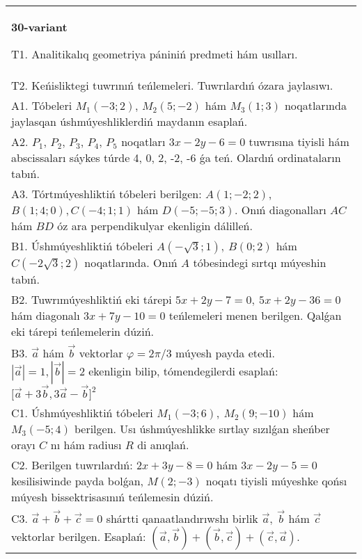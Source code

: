 \documentclass{article}
\begin{document}
\begin{tabular}{m{17cm}}
\textbf{30-variant}
\newline

T1. Analitikalıq geometriya pániniń predmeti hám usılları. 
 \\
T2. 
Keńisliktegi tuwrınıń teńlemeleri. Tuwrılardıń ózara jaylasıwı.
 \\
A1. 
Tóbeleri $M_1(-3;2)$, $M_2(5;-2)$ hám $M_3(1;3)$ 
noqatlarında jaylasqan úshmúyeshliklerdiń maydanın esaplań.
 \\
A2. 
$P_1$, $P_2$, $P_3$, $P_4$, $P_5$  noqatları 
$3x-2y-6=0$ tuwrısına tiyisli hám abscissaları sáykes túrde 
4, 0, 2, -2, -6 ǵa teń. Olardıń ordinataların tabıń.
 \\
A3. 
Tórtmúyeshliktiń tóbeleri berilgen:
$A (1; - 2;2) $, $B (1;4;0),C (- 4;1;1) $ hám $D (- 5; -5;3) $. Onıń diagonalları $AC$ hám $BD$ óz ara 
perpendikulyar ekenligin dálilleń.
 \\
B1. 
Úshmúyeshliktiń tóbeleri
\(A\left(-\sqrt{3};1 \right),\ B(0;2)\) hám
\(C\left(-2\sqrt{3};2 \right)\) noqatlarında. Onıń $A$
tóbesindegi sırtqı múyeshin tabıń.
 \\
B2. 
Tuwrımúyeshliktiń eki tárepi
\(5x+2y-7=0,\ 5x+2y-36=0\) hám diagonalı
\(3x+7y-10=0\) teńlemeleri menen berilgen. Qalǵan eki tárepi
teńlemelerin dúziń.
 \\
B3. 
$\vec{a}$ hám $\vec{b}$ vektorlar $\varphi = 2\pi/3$ múyesh payda etedi. $|\vec{a}| = 1,|\vec{b}| = 2$ ekenligin bilip, tómendegilerdi esaplań: 
$\lbrack\overrightarrow{a} + 3\overrightarrow{b},3\overrightarrow{a} - \overrightarrow{b}\rbrack^{2}$
 \\
C1. 
Úshmúyeshliktiń tóbeleri \(M_{1}( - 3;6),\ M_{2}(9; - 10)\) 
hám \(M_{3}( - 5;4)\) berilgen. Usı úshmúyeshlikke sırtlay sızılǵan
sheńber orayı $C$ nı hám radiusı $R$ di anıqlań.
 \\
C2. 
Berilgen tuwrılardıń:
\(2x + 3y - 8 = 0\) hám \(3x - 2y - 5 = 0\) kesilisiwinde payda
bolǵan, \(M(2; - 3)\) noqatı tiyisli múyeshke qońsı múyesh
bissektrisasınıń teńlemesin dúziń.
 \\
C3. \(\vec{a} + \vec{b} + \vec{c} = 0\) shártti qanaatlandırıwshı birlik \(\vec{a},\ \vec{b}\) hám \(\vec{c}\) vektorlar berilgen. Esaplań: \(\left(\vec{a},\vec{b} \right) + \left(\vec{b},\vec{c} \right) + \left(\vec{c},\vec{a} \right) \).
 \\

\end{tabular}
\vspace{1cm}
\end{document}

